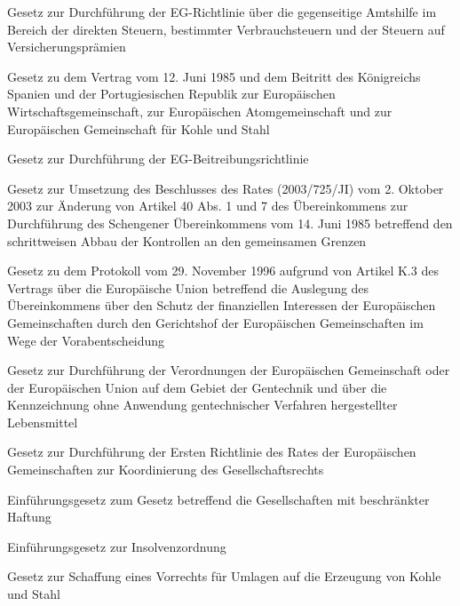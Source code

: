 \item[{EGAHiG}] Gesetz zur Durchführung der EG-Richtlinie über die gegenseitige Amtshilfe im Bereich der direkten Steuern, bestimmter Verbrauchsteuern und der Steuern auf Versicherungsprämien

\item[{EGBeitrESP-PRTG}] Gesetz zu dem Vertrag vom 12. Juni 1985 und dem Beitritt des Königreichs Spanien und der Portugiesischen Republik zur Europäischen Wirtschaftsgemeinschaft, zur Europäischen Atomgemeinschaft und zur Europäischen Gemeinschaft für Kohle und Stahl

\item[{EGBeitrG}] Gesetz zur Durchführung der EG-Beitreibungsrichtlinie

\item[{EGBes725-2003UmsG}] Gesetz zur Umsetzung des Beschlusses des Rates (2003/725/JI) vom 2. Oktober 2003 zur Änderung von Artikel 40 Abs. 1 und 7 des Übereinkommens zur Durchführung des Schengener Übereinkommens vom 14. Juni 1985 betreffend den schrittweisen Abbau der Kontrollen an den gemeinsamen Grenzen

\item[{EGFinSchAProtG}] Gesetz zu dem Protokoll vom 29. November 1996 aufgrund von Artikel K.3 des Vertrags über die Europäische Union betreffend die Auslegung des Übereinkommens über den Schutz der finanziellen Interessen der Europäischen Gemeinschaften durch den Gerichtshof der Europäischen Gemeinschaften im Wege der Vorabentscheidung

\item[{EGGenTDurchfG}] Gesetz zur Durchführung der Verordnungen der Europäischen Gemeinschaft oder der Europäischen Union auf dem Gebiet der Gentechnik und über die Kennzeichnung ohne Anwendung gentechnischer Verfahren hergestellter Lebensmittel

\item[{EGGesRRLDG}] Gesetz zur Durchführung der Ersten Richtlinie des Rates der Europäischen Gemeinschaften zur Koordinierung des Gesellschaftsrechts

\item[{EGGmbHG}] Einführungsgesetz zum Gesetz betreffend die Gesellschaften mit beschränkter Haftung

\item[{EGInsO}] Einführungsgesetz zur Insolvenzordnung

\item[{EGKS-UmVG}] Gesetz zur Schaffung eines Vorrechts für Umlagen auf die Erzeugung von Kohle und Stahl

